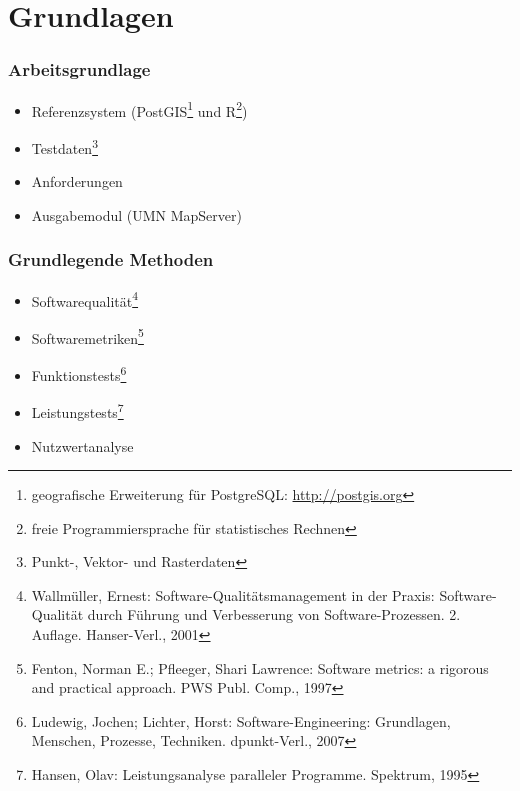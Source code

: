 \documentclass{beamer}
\begin{document}
\section{Grundlagen}
\begin{frame}\frametitle{Arbeitsgrundlage} 
\begin{itemize}
\item Referenzsystem (PostGIS\footnote{geografische Erweiterung für PostgreSQL: \url{http://postgis.org}} und R\footnote{freie Programmiersprache für statistisches Rechnen}) %
\item Testdaten\footnote{Punkt-, Vektor- und Rasterdaten}

\item Anforderungen
\item Ausgabemodul (UMN MapServer)
\end{itemize}
\end{frame}

\begin{frame}\frametitle{Grundlegende Methoden} 
\begin{itemize}
\item Softwarequalität\footnote{Wallmüller, Ernest: Software-Qualitätsmanagement in der Praxis: Software-Qualität durch Führung und Verbesserung von Software-Prozessen. 2. Auflage. Hanser-Verl., 2001}
\item Softwaremetriken\footnote{Fenton, Norman E.; Pfleeger, Shari Lawrence: Software metrics: a rigorous and practical approach. PWS Publ. Comp., 1997}
\item Funktionstests\footnote{Ludewig, Jochen; Lichter, Horst: Software-Engineering: Grundlagen, Menschen, Prozesse, Techniken. dpunkt-Verl., 2007}
\item Leistungstests\footnote{Hansen, Olav: Leistungsanalyse paralleler Programme. Spektrum, 1995}
\item Nutzwertanalyse
%
\end{itemize}
\end{frame}
\end{document}
